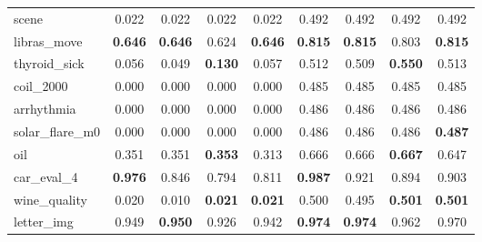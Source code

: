 \begin{figure}[ht]
\begin{tabular}{p{22mm}|*4{p{14mm}}|*4{p{14mm}}}
        scene&\multicolumn{1}{c}{0.022}&\multicolumn{1}{c}{0.022}&\multicolumn{1}{c}{0.022}&\multicolumn{1}{c|}{0.022}&\multicolumn{1}{c}{0.492}&\multicolumn{1}{c}{0.492}&\multicolumn{1}{c}{0.492}&\multicolumn{1}{c}{0.492}\\
        libras\_move&\multicolumn{1}{c}{\textbf{0.646}}&\multicolumn{1}{c}{\textbf{0.646}}&\multicolumn{1}{c}{0.624}&\multicolumn{1}{c|}{\textbf{0.646}}&\multicolumn{1}{c}{\textbf{0.815}}&\multicolumn{1}{c}{\textbf{0.815}}&\multicolumn{1}{c}{0.803}&\multicolumn{1}{c}{\textbf{0.815}}\\
        thyroid\_sick&\multicolumn{1}{c}{0.056}&\multicolumn{1}{c}{0.049}&\multicolumn{1}{c}{\textbf{0.130}}&\multicolumn{1}{c|}{0.057}&\multicolumn{1}{c}{0.512}&\multicolumn{1}{c}{0.509}&\multicolumn{1}{c}{\textbf{0.550}}&\multicolumn{1}{c}{0.513}\\
        coil\_2000&\multicolumn{1}{c}{0.000}&\multicolumn{1}{c}{0.000}&\multicolumn{1}{c}{0.000}&\multicolumn{1}{c|}{0.000}&\multicolumn{1}{c}{0.485}&\multicolumn{1}{c}{0.485}&\multicolumn{1}{c}{0.485}&\multicolumn{1}{c}{0.485}\\
        arrhythmia&\multicolumn{1}{c}{0.000}&\multicolumn{1}{c}{0.000}&\multicolumn{1}{c}{0.000}&\multicolumn{1}{c|}{0.000}&\multicolumn{1}{c}{0.486}&\multicolumn{1}{c}{0.486}&\multicolumn{1}{c}{0.486}&\multicolumn{1}{c}{0.486}\\
        solar\_flare\_m0&\multicolumn{1}{c}{0.000}&\multicolumn{1}{c}{0.000}&\multicolumn{1}{c}{0.000}&\multicolumn{1}{c|}{0.000}&\multicolumn{1}{c}{0.486}&\multicolumn{1}{c}{0.486}&\multicolumn{1}{c}{0.486}&\multicolumn{1}{c}{\textbf{0.487}}\\
        oil&\multicolumn{1}{c}{0.351}&\multicolumn{1}{c}{0.351}&\multicolumn{1}{c}{\textbf{0.353}}&\multicolumn{1}{c|}{0.313}&\multicolumn{1}{c}{0.666}&\multicolumn{1}{c}{0.666}&\multicolumn{1}{c}{\textbf{0.667}}&\multicolumn{1}{c}{0.647}\\
        car\_eval\_4&\multicolumn{1}{c}{\textbf{0.976}}&\multicolumn{1}{c}{0.846}&\multicolumn{1}{c}{0.794}&\multicolumn{1}{c|}{0.811}&\multicolumn{1}{c}{\textbf{0.987}}&\multicolumn{1}{c}{0.921}&\multicolumn{1}{c}{0.894}&\multicolumn{1}{c}{0.903}\\
        wine\_quality&\multicolumn{1}{c}{0.020}&\multicolumn{1}{c}{0.010}&\multicolumn{1}{c}{\textbf{0.021}}&\multicolumn{1}{c|}{\textbf{0.021}}&\multicolumn{1}{c}{0.500}&\multicolumn{1}{c}{0.495}&\multicolumn{1}{c}{\textbf{0.501}}&\multicolumn{1}{c}{\textbf{0.501}}\\
        letter\_img&\multicolumn{1}{c}{0.949}&\multicolumn{1}{c}{\textbf{0.950}}&\multicolumn{1}{c}{0.926}&\multicolumn{1}{c|}{0.942}&\multicolumn{1}{c}{\textbf{0.974}}&\multicolumn{1}{c}{\textbf{0.974}}&\multicolumn{1}{c}{0.962}&\multicolumn{1}{c}{0.970}\\

\end{tabular}
\end{figure}
